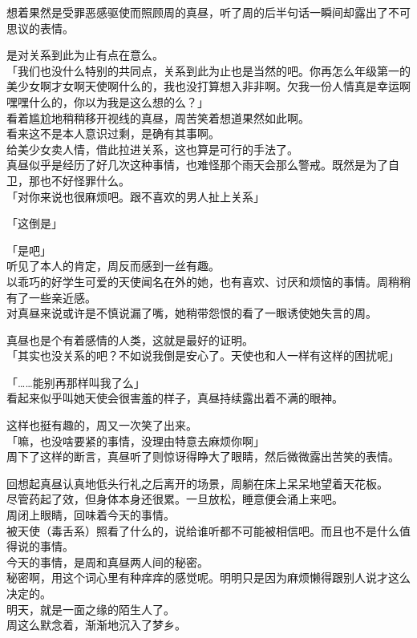 想着果然是受罪恶感驱使而照顾周的真昼，听了周的后半句话一瞬间却露出了不可思议的表情。

是对关系到此为止有点在意么。\\

「我们也没什么特别的共同点，关系到此为止也是当然的吧。你再怎么年级第一的美少女啊才女啊天使啊什么的，我也没打算想入非非啊。欠我一份人情真是幸运啊嘿嘿什么的，你以为我是这么想的么？」\\

看着尴尬地稍稍移开视线的真昼，周苦笑着想道果然如此啊。\\

看来这不是本人意识过剩，是确有其事啊。\\

给美少女卖人情，借此拉进关系，这也算是可行的手法了。\\

真昼似乎是经历了好几次这种事情，也难怪那个雨天会那么警戒。既然是为了自卫，那也不好怪罪什么。\\

「对你来说也很麻烦吧。跟不喜欢的男人扯上关系」

「这倒是」

「是吧」\\

听见了本人的肯定，周反而感到一丝有趣。\\

以乖巧的好学生可爱的天使闻名在外的她，也有喜欢、讨厌和烦恼的事情。周稍稍有了一些亲近感。\\

对真昼来说或许是不慎说漏了嘴，她稍带怨恨的看了一眼诱使她失言的周。

真昼也是个有着感情的人类，这就是最好的证明。\\

「其实也没关系的吧？不如说我倒是安心了。天使也和人一样有这样的困扰呢」

「……能别再那样叫我了么」\\

看起来似乎叫她天使会很害羞的样子，真昼持续露出着不满的眼神。

这样也挺有趣的，周又一次笑了出来。\\

「嘛，也没啥要紧的事情，没理由特意去麻烦你啊」\\

周下了这样的断言，真昼听了则惊讶得睁大了眼睛，然后微微露出苦笑的表情。\\

\vspace{2\baselineskip}

回想起真昼认真地低头行礼之后离开的场景，周躺在床上呆呆地望着天花板。\\

尽管药起了效，但身体本身还很累。一旦放松，睡意便会涌上来吧。\\

周闭上眼睛，回味着今天的事情。\\

被天使（毒舌系）照看了什么的，说给谁听都不可能被相信吧。而且也不是什么值得说的事情。\\

今天的事情，是周和真昼两人间的秘密。\\

秘密啊，用这个词心里有种痒痒的感觉呢。明明只是因为麻烦懒得跟别人说才这么决定的。\\

明天，就是一面之缘的陌生人了。\\

周这么默念着，渐渐地沉入了梦乡。
